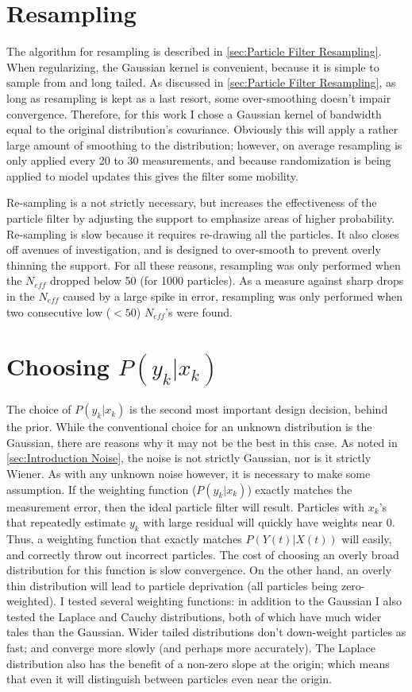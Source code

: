 \section{Resampling}
\label{sec:Resampling}
The algorithm for resampling is described in \autoref{sec:Particle Filter Resampling}.
When regularizing, the Gaussian kernel is convenient,
because it is simple to sample from and long tailed.
As discussed in \autoref{sec:Particle Filter Resampling},
as long as resampling is kept as a last resort, some over-smoothing
doesn't impair convergence. Therefore, for this work I chose a Gaussian kernel of
bandwidth equal to the original distribution's covariance. Obviously this will
apply a rather large amount of smoothing to the distribution; however, on average
resampling is only applied every 20 to 30 measurements, and because randomization
is being applied to model updates this gives the filter some mobility. 

Re-sampling is a not strictly necessary, but increases the effectiveness
of the particle filter by adjusting the support to emphasize areas
of higher probability. Re-sampling is slow because it requires re-drawing
all the particles. It also closes off avenues of investigation, and is
designed to over-smooth to prevent overly thinning the support. For all these
reasons, resampling was only performed when the $N_{eff}$ dropped below
50 (for 1000 particles).  As a measure against sharp drops in the $N_{eff}$ 
caused by a large spike in error, resampling was only performed when 
two consecutive low ($<50$) $N_{eff}$'s were found. 

\section{Choosing $P(y_k | x_k)$}
\label{sec:Methods Weighting Function}
The choice of $P(y_k | x_k)$ is the second most important design decision, behind 
the prior. While the conventional choice for an unknown distribution is the 
Gaussian, there are reasons why it may not be the best in this case.  
As noted in \autoref{sec:Introduction Noise}, the noise is not strictly Gaussian,
nor is it strictly Wiener. As with any unknown noise however, it is necessary 
to make some assumption. If the weighting function ($P(y_k | x_k)$) exactly
matches the measurement error, then the ideal particle filter will result.
Particles with $x_k$'s that repeatedly estimate $y_k$ with large residual 
will quickly have weights near 0. Thus, a weighting function that
exactly matches $P(Y(t) | X(t))$ will easily, and correctly throw out incorrect
particles.  The cost of choosing an overly broad distribution for this
function is slow convergence.  On the other hand, an overly thin 
distribution will lead to particle deprivation (all particles
being zero-weighted).  I tested several weighting
functions: in addition to the Gaussian I also tested the Laplace and Cauchy
distributions, both of which have much wider tales than the Gaussian. 
Wider tailed distributions don't down-weight
particles as fast; and converge more slowly (and perhaps more accurately). 
The Laplace distribution also has the
benefit of a non-zero slope at the origin; which means that even
it will distinguish between particles even near the origin.

